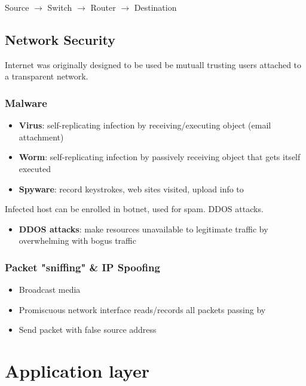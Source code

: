 \documentclass[11pt]{article}
\begin{document}
Source \(\rightarrow\)     Switch \(\rightarrow\)      Router \(\rightarrow\)     Destination 


\subsection{Network Security}
\label{sec:org2a92769}

Internet was originally designed to be used be mutuall trusting users
attached to a transparent network.

\subsubsection{Malware}
\label{sec:org9fdc944}
\begin{itemize}
\item \textbf{Virus}: self-replicating infection by receiving/executing object
(email attachment)
\item \textbf{Worm}: self-replicating infection by passively receiving object
that gets itself executed
\item \textbf{Spyware}: record keystrokes, web sites visited, upload info to
\end{itemize}

Infected host can be enrolled in botnet, used for spam. DDOS attacks.

\begin{itemize}
\item \textbf{DDOS attacks}: make resources unavailable to legitimate traffic by
overwhelming with bogus traffic
\end{itemize}

\subsubsection{Packet "sniffing" \& IP Spoofing}
\label{sec:org3cf59e2}
\begin{itemize}
\item Broadcast media
\item Promiscuous network interface reads/records all packets passing by
\item Send packet with false source address
\end{itemize}




\section{Application layer}
\label{sec:orgfe2ba04}
\end{document}

